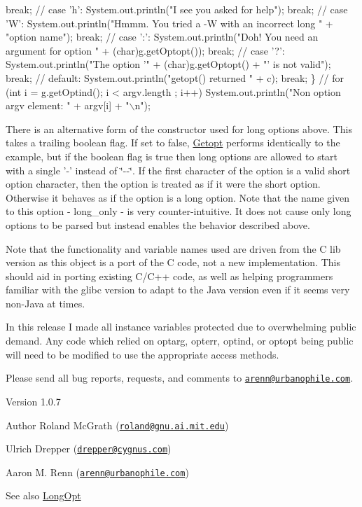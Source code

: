 \begin{DoxyPre}
          break;
          //
        case 'h':
          System.out.println("I see you asked for help");
          break;
          //
        case 'W':
          System.out.println("Hmmm. You tried a -W with an incorrect long " +
                             "option name");
          break;
          //
        case ':':
          System.out.println("Doh! You need an argument for option " +
                             (char)g.getOptopt());
          break;
          //
        case '?':
          System.out.println("The option '" + (char)g.getOptopt() + 
                           "' is not valid");
          break;
          //
        default:
          System.out.println("getopt() returned " + c);
          break;
     \}
 //
 for (int i = g.getOptind(); i < argv.length ; i++)
   System.out.println("Non option argv element: " + argv[i] + "\(\backslash\)n");
 \end{DoxyPre}
 

There is an alternative form of the constructor used for long options above. This takes a trailing boolean flag. If set to false, \hyperlink{classgnu_1_1getopt_1_1_getopt}{Getopt} performs identically to the example, but if the boolean flag is true then long options are allowed to start with a single '-\/' instead of \char`\"{}-\/-\/\char`\"{}. If the first character of the option is a valid short option character, then the option is treated as if it were the short option. Otherwise it behaves as if the option is a long option. Note that the name given to this option -\/ long\_\-only -\/ is very counter-\/intuitive. It does not cause only long options to be parsed but instead enables the behavior described above. 

Note that the functionality and variable names used are driven from the C lib version as this object is a port of the C code, not a new implementation. This should aid in porting existing C/C++ code, as well as helping programmers familiar with the glibc version to adapt to the Java version even if it seems very non-\/Java at times. 

In this release I made all instance variables protected due to overwhelming public demand. Any code which relied on optarg, opterr, optind, or optopt being public will need to be modified to use the appropriate access methods. 

Please send all bug reports, requests, and comments to \href{mailto:arenn@urbanophile.com}{\tt arenn@urbanophile.com}.

\begin{DoxyVersion}{Version}
1.0.7
\end{DoxyVersion}
\begin{DoxyAuthor}{Author}
Roland McGrath (\href{mailto:roland@gnu.ai.mit.edu}{\tt roland@gnu.ai.mit.edu}) 

Ulrich Drepper (\href{mailto:drepper@cygnus.com}{\tt drepper@cygnus.com}) 

Aaron M. Renn (\href{mailto:arenn@urbanophile.com}{\tt arenn@urbanophile.com})
\end{DoxyAuthor}
\begin{DoxySeeAlso}{See also}
\hyperlink{classgnu_1_1getopt_1_1_long_opt}{LongOpt} 
\end{DoxySeeAlso}


